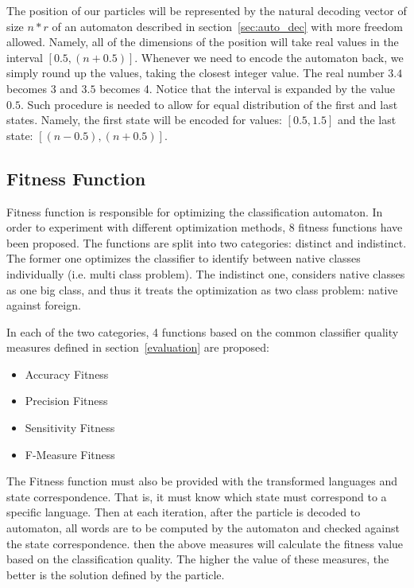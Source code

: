 \documentclass{mini}
\begin{document}
The position of our particles will be represented by the natural decoding vector of size $n*r$ of an automaton described in section~\ref{sec:auto_dec} with more freedom allowed. Namely, all of the dimensions of the position will take real values in the interval $[0.5, (n+0.5)]$. Whenever we need to encode the automaton back, we simply round up the values, taking the closest integer value. The real number $3.4$ becomes $3$ and $3.5$ becomes 4. Notice that the interval is expanded by the value $0.5$. Such procedure is needed to allow for equal distribution of the first and last states. Namely, the first state will be encoded for values: $[0.5, 1.5]$ and the last state: $[(n-0.5), (n+0.5)]$.

\subsection{Fitness Function}

Fitness function is responsible for optimizing the classification automaton. In order to experiment with different optimization methods, 8 fitness functions have been proposed. The functions are split into two categories: distinct and indistinct. The former one optimizes the classifier to identify between native classes individually (i.e. multi class problem). The indistinct one, considers native classes as one big class, and thus it treats the optimization as two class problem: native against foreign.

In each of the two categories, 4 functions based on the common classifier quality measures defined in section~\ref{evaluation} are proposed:
\begin{itemize}
    \item Accuracy Fitness
    \item Precision Fitness
    \item Sensitivity Fitness
    \item F-Measure Fitness
\end{itemize}

The Fitness function must also be provided with the transformed languages and state correspondence. That is, it must know which state must correspond to a specific language. Then at each iteration, after the particle is decoded to automaton, all words are to be computed by the automaton and checked against the state correspondence. then the above measures will calculate the fitness value based on the classification quality. The higher the value of these measures, the better is the solution defined by the particle.
\end{document}
